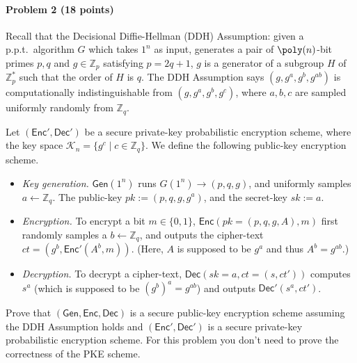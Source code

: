 \paragraph{Problem 2 (18 points)}

Recall that the Decisional Diffie-Hellman (DDH) Assumption: given a p.p.t.~algorithm $G$ which takes $1^n$ as input, generates a pair of $\poly(n)$-bit primes $p,q$ and $g\in\mathbb{Z}_p$ satisfying $p=2q+1$, $g$ is a generator of a subgroup $H$ of $\mathbb{Z}_p^*$ such that the order of $H$ is $q$. The DDH Assumption says $(g, g^a, g^b, g^{ab})$ is computationally indistinguishable from $(g, g^a,g^b,g^c)$, where $a,b,c$ are sampled uniformly randomly from $\mathbb{Z}_q$. 

Let $(\mathsf{Enc}',\mathsf{Dec}')$ be a secure private-key probabilistic encryption scheme, where the key space $\mathcal{K}_n=\{g^c\mid c\in\mathbb{Z}_q\}$. We define the following public-key encryption scheme.
\begin{itemize}
    \item \emph{Key generation.} $\mathsf{Gen}(1^n)$ runs $G(1^n)\to (p,q,g)$, and uniformly samples $a\gets\mathbb{Z}_q$. The public-key $pk:=(p,q,g,g^a)$, and the secret-key $sk:=a$. 
    \item \emph{Encryption.} To encrypt a bit $m\in\{0,1\}$, $\mathsf{Enc}(pk=(p,q,g,A), m)$ first randomly samples a $b\gets\mathbb{Z}_q$, and outputs the cipher-text $ct=(g^b,\mathsf{Enc}'(A^b,m))$. (Here, $A$ is supposed to be $g^a$ and thus $A^b=g^{ab}$.)
    \item \emph{Decryption.} To decrypt a cipher-text, $\mathsf{Dec}(sk=a,ct=(s,ct'))$ computes $s^a$ (which is supposed to be $(g^b)^a=g^{ab}$) and outputs $\mathsf{Dec}'(s^a,ct')$. 
\end{itemize}

Prove that $(\mathsf{Gen},\mathsf{Enc},\mathsf{Dec})$ is a secure public-key encryption scheme assuming the DDH Assumption holds and $(\mathsf{Enc}',\mathsf{Dec}')$ is a secure private-key probabilistic encryption scheme. For this problem you don't need to prove the correctness of the PKE scheme. 